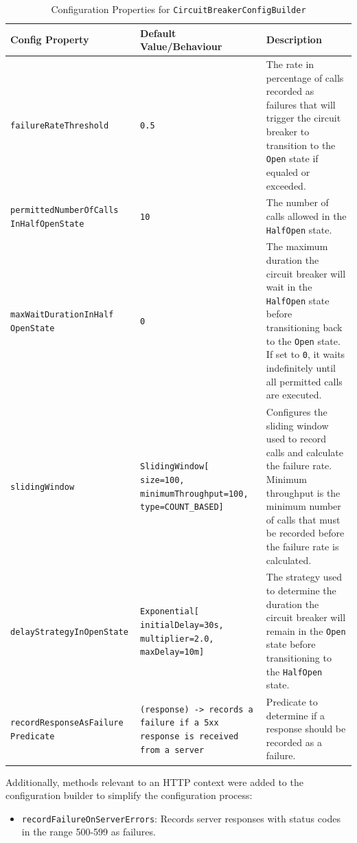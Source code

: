 \begin{table}[!htb]
    \centering
    \caption{Configuration Properties for \texttt{CircuitBreakerConfigBuilder}}
    \label{tab:circuit-breaker-config-builder}
    \vspace{0.3cm}
    \begin{tabular}{|p{5cm}|p{5cm}|p{6cm}|}
        \hline
        \textbf{Config Property}                   & \textbf{Default Value/Behaviour}                                                     & \textbf{Description}                                                                                                                                        \\ \hline
        \texttt{failureRateThreshold}              & \texttt{0.5}                                                                         & The rate in percentage of calls recorded as failures that will trigger the circuit breaker to transition to the \texttt{Open} state if equaled or exceeded. \\ \hline
        \texttt{permittedNumberOfCalls InHalfOpenState} & \texttt{10} & The number of calls
        allowed in the \texttt{HalfOpen} state. \\ \hline
        \texttt{maxWaitDurationInHalf OpenState} & \texttt{0} & The maximum duration
        the circuit breaker will wait in the \texttt{HalfOpen} state before transitioning back to the \texttt{Open} state.
        If set to \texttt{0}, it waits indefinitely until all permitted calls are executed. \\ \hline
        \texttt{slidingWindow} & \texttt{SlidingWindow[ size=100, minimumThroughput=100, type=COUNT\_BASED]}
        & Configures the sliding window used to record calls and calculate the failure rate.
        Minimum throughput is the minimum number of calls
        that must be recorded before the failure rate is calculated.
        \\ \hline
        \texttt{delayStrategyInOpenState}          & \texttt{Exponential[ initialDelay=30s, multiplier=2.0, maxDelay=10m]}     & The strategy used to determine the duration the circuit breaker will remain in the \texttt{Open} state before transitioning to the \texttt{HalfOpen} state. \\ \hline
        \texttt{recordResponseAsFailure Predicate} & \texttt{(response) -> records a failure if a 5xx response is received from a server}                               & Predicate to determine if a response should be recorded as a failure.                                   \\ \hline
    \end{tabular}
\end{table}

Additionally, methods relevant to an HTTP context were added to the configuration builder to simplify the configuration process:

\begin{itemize}
    \item \texttt{recordFailureOnServerErrors}: Records server responses with status codes in the range 500-599 as failures.
\end{itemize}
